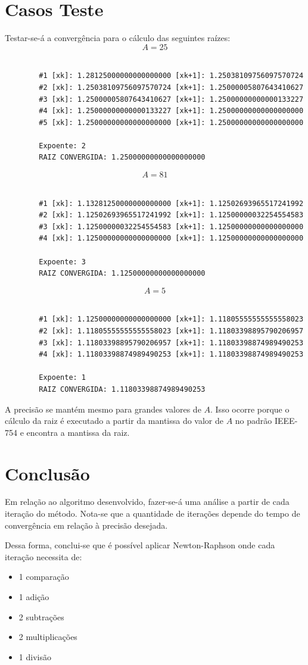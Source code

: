 	\section{Casos Teste}
	Testar-se-á a convergência para o cálculo das seguintes raízes:
	$$A = 25$$\\
	\begin{verbatim}
		#1 [xk]: 1.28125000000000000000	[xk+1]: 1.25038109756097570724
		#2 [xk]: 1.25038109756097570724	[xk+1]: 1.25000005807643410627
		#3 [xk]: 1.25000005807643410627	[xk+1]: 1.25000000000000133227
		#4 [xk]: 1.25000000000000133227	[xk+1]: 1.25000000000000000000
		#5 [xk]: 1.25000000000000000000	[xk+1]: 1.25000000000000000000

		Expoente: 2
		RAIZ CONVERGIDA: 1.25000000000000000000
	\end{verbatim}
	$$A = 81$$\\
	\begin{verbatim}
		#1 [xk]: 1.13281250000000000000	[xk+1]: 1.12502693965517241992
		#2 [xk]: 1.12502693965517241992	[xk+1]: 1.12500000032254554583
		#3 [xk]: 1.12500000032254554583	[xk+1]: 1.12500000000000000000
		#4 [xk]: 1.12500000000000000000	[xk+1]: 1.12500000000000000000

		Expoente: 3
		RAIZ CONVERGIDA: 1.12500000000000000000
	\end{verbatim}
	$$A = 5$$\\
	\begin{verbatim}
		#1 [xk]: 1.12500000000000000000	[xk+1]: 1.11805555555555558023
		#2 [xk]: 1.11805555555555558023	[xk+1]: 1.11803398895790206957
		#3 [xk]: 1.11803398895790206957	[xk+1]: 1.11803398874989490253
		#4 [xk]: 1.11803398874989490253	[xk+1]: 1.11803398874989490253

		Expoente: 1
		RAIZ CONVERGIDA: 1.11803398874989490253
	\end{verbatim}

	A precisão se mantém mesmo para grandes valores de $A$. Isso ocorre porque o cálculo da raiz
	é executado a partir da mantissa do valor de $A$ no padrão IEEE-754 e encontra a mantissa da raiz.

	\section{Conclusão}
	Em relação ao algoritmo desenvolvido, fazer-se-á uma análise a partir de cada iteração do método.
	Nota-se que a quantidade de iterações depende do tempo de convergência em relação à precisão
	desejada.

	Dessa forma, conclui-se que é possível aplicar Newton-Raphson onde cada iteração necessita de:
	\begin{itemize}
		\item 1 comparação
		\item 1 adição
		\item 2 subtrações
		\item 2 multiplicações
		\item 1 divisão
	\end{itemize}

